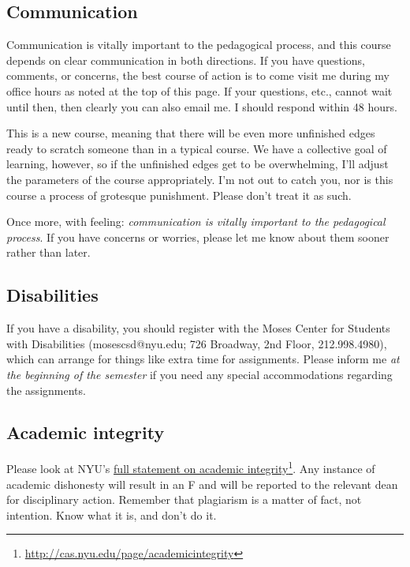 \subsection{Communication}
\label{communication}

Communication is vitally important to the pedagogical process, and this course
depends on clear communication in both directions. If you have questions,
comments, or concerns, the best course of action is to come visit me during my
office hours as noted at the top of this page. If your questions, etc., cannot
wait until then, then clearly you can also email me. I should respond within
48 hours.

This is a new course, meaning that there will be even more unfinished edges
ready to scratch someone than in a typical course. We have a collective goal of
learning, however, so if the unfinished edges get to be overwhelming, I’ll
adjust the parameters of the course appropriately. I’m not out to catch you,
nor is this course a process of grotesque punishment. Please don’t treat it as
such.

Once more, with feeling: \emph{communication is vitally important to the pedagogical
process}. If you have concerns or worries, please let me know about them sooner
rather than later.

\subsection{Disabilities}
\label{disabilities}

If you have a disability, you should register with the Moses Center for
Students with Disabilities (mosescsd@nyu.edu; 726 Broadway, 2nd Floor,
212.998.4980), which can arrange for things like extra time for assignments.
Please inform me \emph{at the beginning of the semester} if you need any special
accommodations regarding the assignments.

\subsection{Academic integrity}
\label{academicintegrity}

Please look at NYU’s \href{http://cas.nyu.edu/page/academicintegrity}{full statement on academic
integrity}\footnote{\href{http://cas.nyu.edu/page/academicintegrity}{http:/\slash cas.nyu.edu\slash page\slash academicintegrity}}. Any instance of
academic dishonesty will result in an F and will be reported to the relevant
dean for disciplinary action. Remember that plagiarism is a matter of fact, not
intention. Know what it is, and don’t do it.

